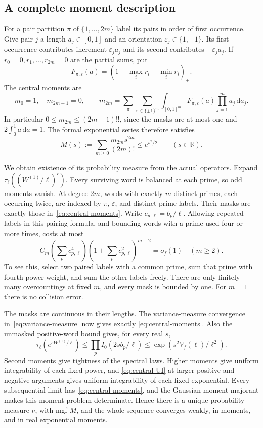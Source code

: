 \documentclass[11pt,reqno]{amsart}
\numberwithin{equation}{section}
\newcommand{\R}{\mathbb R}
\newcommand{\dd}{\,\mathrm d}
\begin{document}
\subsection*{A complete moment description}

For a pair partition $\pi$ of $\{1,\ldots,2m\}$ label its
pairs in order of first occurrence. Give pair $j$ a length
$a_j\in[0,1]$ and an orientation $\varepsilon_j\in\{1,-1\}$.
Its first occurrence contributes increment $\varepsilon_ja_j$
and its second contributes $-\varepsilon_ja_j$. If
$r_0=0,r_1,\ldots,r_{2m}=0$ are the partial sums, put
\[
 F_{\pi,\varepsilon}(a)
    =(1-\max_i r_i+\min_i r_i)_+.
\]
The central moments are
\begin{equation}\label{eq:central-moments}
 m_0=1,\quad m_{2m+1}=0,\qquad
 m_{2m}=\sum_\pi\sum_{\varepsilon\in\{\pm1\}^m}
        \int_{[0,1]^m}F_{\pi,\varepsilon}(a)
                           \prod_{j=1}^m a_j\dd a_j.
\end{equation}
In particular $0\le m_{2m}\le(2m-1)!!$, since the masks are
at most one and $2\int_0^1a\dd a=1$. The formal exponential
series therefore satisfies
\begin{equation}\label{eq:central-entire}
 M(s):=\sum_{m\ge0}\frac{m_{2m}s^{2m}}{(2m)!}\le e^{s^2/2}
 \qquad(s\in\R).
\end{equation}

We obtain existence of its probability measure from the actual
operators. Expand $\tau_\ell((W^{(1)}/\ell)^r)$. Every surviving
word is balanced at each prime, so odd moments vanish. At degree
$2m$, words with exactly $m$ distinct primes, each occurring twice,
are indexed by $\pi$, $\varepsilon$, and distinct prime labels.
Their masks are exactly those in~\eqref{eq:central-moments}.
Write $c_{p,\ell}=b_p/\ell$. Allowing repeated labels in this
pairing formula, and bounding words with a prime used four or
more times, costs at most
\[
 C_m\left(\sum_pc_{p,\ell}^4\right)
           \left(1+\sum_pc_{p,\ell}^2\right)^{m-2}=o_f(1)
 \quad(m\ge2).
\]
To see this, select two paired labels with a common prime,
sum that prime with fourth-power weight, and sum the other
labels freely. There are only finitely many overcountings at
fixed $m$, and every mask is bounded by one. For $m=1$ there
is no collision error.

The masks are continuous in their lengths. The variance-measure
convergence in~\eqref{eq:variance-measure} now gives exactly
\eqref{eq:central-moments}. Also the unmasked positive-word bound
gives, for every real $s$,
\begin{equation}\label{eq:central-UI}
 \tau_\ell(e^{sW^{(1)}/\ell})
 \le\prod_pI_0(2sb_p/\ell)
 \le\exp(s^2V_f(\ell)/\ell^2).
\end{equation}
Second moments give tightness of the spectral laws. Higher moments
give uniform integrability of each fixed power, and
\eqref{eq:central-UI} at larger positive and negative arguments
gives uniform integrability of each fixed exponential.
Every subsequential limit has~\eqref{eq:central-moments}, and
the Gaussian moment majorant makes this moment problem determinate.
Hence there is a unique probability measure $\nu$, with mgf
$M$, and the whole sequence converges weakly, in moments, and
in real exponential moments.
\end{document}
